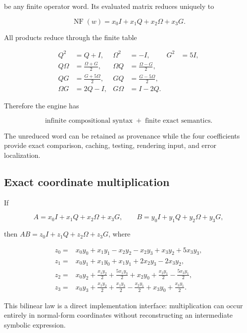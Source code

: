 \documentclass[11pt,letterpaper]{article}
\theoremstyle{clearonyx}
\newcommand{\NF}{\operatorname{NF}}
\begin{document}
be any finite operator word.  Its evaluated matrix reduces uniquely to

\begin{equation}
\NF(w)=x_0I+x_1Q+x_2\Omega+x_3G.
\end{equation}

All products reduce through the finite table

\begin{align}
Q^2&=Q+I,
&\Omega^2&=-I,
&G^2&=5I,\\
Q\Omega&=\frac{\Omega+G}{2},
&\Omega Q&=\frac{\Omega-G}{2},\\
QG&=\frac{G+5\Omega}{2},
&GQ&=\frac{G-5\Omega}{2},\\
\Omega G&=2Q-I,
&G\Omega&=I-2Q.
\end{align}

Therefore the engine has

\begin{equation}
\boxed{\text{infinite compositional syntax}\; +\; \text{finite exact semantics}.}
\end{equation}

The unreduced word can be retained as provenance while the four coefficients provide exact comparison, caching, testing, rendering input, and error localization.

\subsection{Exact coordinate multiplication}

If

\begin{equation}
A=x_0I+x_1Q+x_2\Omega+x_3G,
\qquad
B=y_0I+y_1Q+y_2\Omega+y_3G,
\end{equation}

then $AB=z_0I+z_1Q+z_2\Omega+z_3G$, where

\begin{align}
 z_0={}&x_0y_0+x_1y_1-x_2y_2-x_2y_3+x_3y_2+5x_3y_3,\\
 z_1={}&x_0y_1+x_1y_0+x_1y_1+2x_2y_3-2x_3y_2,\\
 z_2={}&x_0y_2+\frac{x_1y_2}{2}+\frac{5x_1y_3}{2}
       +x_2y_0+\frac{x_2y_1}{2}-\frac{5x_3y_1}{2},\\
 z_3={}&x_0y_3+\frac{x_1y_2}{2}+\frac{x_1y_3}{2}
       -\frac{x_2y_1}{2}+x_3y_0+\frac{x_3y_1}{2}.
\end{align}

This bilinear law is a direct implementation interface: multiplication can occur entirely in normal-form coordinates without reconstructing an intermediate symbolic expression.
\end{document}
